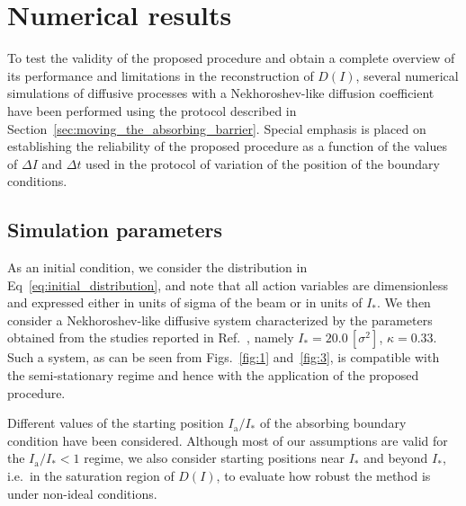 {%

\section{Numerical results}
\label{sec:numerical_results}


To test the validity of the proposed procedure and obtain a complete overview of its performance and limitations in the reconstruction of $D(I)$, several numerical simulations of diffusive processes with a Nekhoroshev-like diffusion coefficient have been performed using the protocol described in Section~\ref{sec:moving_the_absorbing_barrier}. Special emphasis is placed on establishing the reliability of the proposed procedure as a function of the values of $\Delta I$ and $\Delta t$ used in the protocol of variation of the position of the boundary conditions.


\subsection{Simulation parameters}


As an initial condition, we consider the distribution in Eq~\eqref{eq:initial_distribution}, and note that all action variables are {dimensionless and expressed either in units of sigma of the beam or in units of $I_\ast$}. We then consider a Nekhoroshev-like diffusive system characterized by the parameters obtained from the studies reported in Ref.~\cite{bazzani2020diffusion}, namely $I_\ast = 20.0\,[\sigma^2]$, $\kappa = 0.33$. Such a system, as can be seen from Figs.~\ref{fig:1} and~\ref{fig:3}, is compatible with the semi-stationary regime and hence with the application of the proposed procedure.

Different values of the starting position $I_\mathrm{a}/I_\ast$ of the absorbing boundary condition have been considered. Although most of our assumptions are valid for the $I_\mathrm{a}/I_\ast < 1$ regime, we also consider starting positions near $I_\ast$ and beyond $I_\ast$, i.e.\ in the saturation region of $D(I)$, to evaluate how robust the method is under non-ideal conditions.

}
